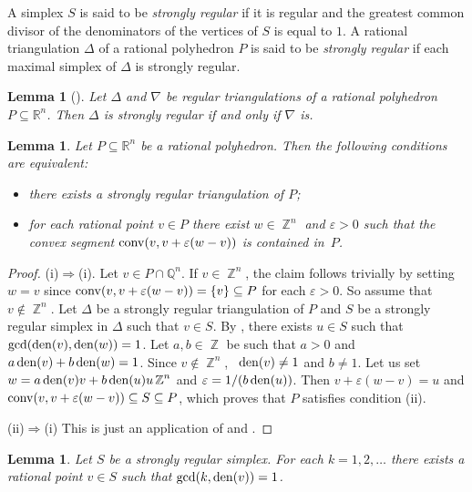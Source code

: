 \documentclass[reqno, draft]{amsart}
\newtheorem{lemma}[theorem]{Lemma}
\theoremstyle{definition}
\begin{document}
A simplex $S$ is said to  be  {\it strongly regular} 
if it is regular and 
the greatest common divisor of the denominators of
the vertices of $S$ is equal to $1$.
A  rational triangulation $\Delta$  of a rational polyhedron $P$ is
said to be {\it strongly regular}  if each maximal simplex of $\Delta$  
is strongly regular.

\begin{lemma}[{\cite[Lemma~3.3]{CM2013}}]
\label{Lem:StronglyRegStable}
Let  $\Delta$ and $\nabla$ be regular triangulations
of a rational polyhedron $P\subseteq{\mathbb{R}}^n$.
Then $\Delta$ is strongly regular if and only if  $\nabla$ is.
\end{lemma}

\begin{lemma}\label{Lem:SRandConvexSet}
Let $P\subseteq{\mathbb{R}}^{n}$ be a rational polyhedron. 
Then the following  conditions  are equivalent:
\begin{itemize}
  \item[(i)] there exists a strongly regular triangulation of $P$;
  \item[(ii)] for each rational point $v\in P$ 
 there exist $w\in \operatorname{\mathbb{Z}}^n$ and $\varepsilon>0$
 such that the convex segment $\operatorname{{\rm conv}}(v,v+\varepsilon (w-v))$
 is contained in~$P$.
\end{itemize}
\end{lemma}
\begin{proof}
(i)$\Rightarrow$(i). Let $v\in P\cap{\mathbb{Q}}^n$.
 If $v\in\operatorname{\mathbb{Z}}^n$, the claim follows trivially by setting $w=v$  since $\operatorname{{\rm conv}}(v,v+\varepsilon(w-v))=\{v\}\subseteq P$ for each $\varepsilon>0$. 
So assume that $v\notin\operatorname{\mathbb{Z}}^n$. Let $\Delta$ be a strongly regular triangulation of $P$ and $S$ be a strongly regular simplex in $\Delta$ such that $v\in S$. By \cite[Theorem~4.4]{Cab201X}, there exists $u\in S$ such that $\gcd(\operatorname{{\rm den}}(v),\operatorname{{\rm den}}(w))=1$. Let $a,b\in\operatorname{\mathbb{Z}}$ be such that $a>0$ and $a\operatorname{{\rm den}}(v)+b\operatorname{{\rm den}}(w)=1$. Since $v\notin \operatorname{\mathbb{Z}}^n$, \ $\operatorname{{\rm den}}(v)\neq 1$ and $b\neq 1$. Let us set $w=a\operatorname{{\rm den}}(v) v+b\operatorname{{\rm den}}(u)u\operatorname{\mathbb{Z}}^n$ and $\varepsilon=1/(b\operatorname{{\rm den}}(u))$. Then
$v+ \varepsilon (w-v)=u$ and $\operatorname{{\rm conv}}(v,v+ \varepsilon (w-v))\subseteq S\subseteq P$, which proves that $P$ satisfies condition (ii).

(ii)$\Rightarrow$(i) This is just an application of \cite[Lemma~4.1]{Je2010} and \cite[Theorem~4.17]{Cab201X}.
\end{proof}
\begin{lemma}\label{Lem:ExistsCoprime}
Let $S$ be a strongly regular simplex. 
For each $k=1,2,\ldots$ there exists a rational point $v\in S$
such that $\gcd(k,\operatorname{{\rm den}}(v))=1$.
\end{lemma}
\end{document}
